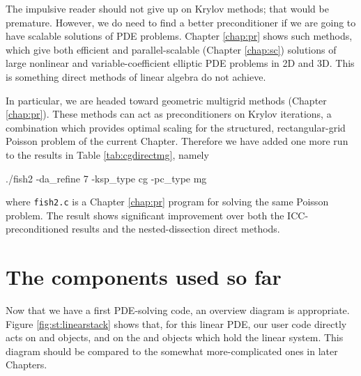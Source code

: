 The impulsive reader should not give up on Krylov methods; that would be premature.  However, we do need to find a better preconditioner if we are going to have scalable solutions of PDE problems.  Chapter \ref{chap:pr} shows such methods, which give both efficient and parallel-scalable (Chapter \ref{chap:sc}) solutions of large nonlinear and variable-coefficient elliptic PDE problems in 2D and 3D.  This is something direct methods of linear algebra do not achieve.

In particular, we are headed toward geometric multigrid methods (Chapter \ref{chap:pr}).  These methods can act as preconditioners on Krylov iterations, a combination which provides optimal scaling for the structured, rectangular-grid Poisson problem of the current Chapter.  Therefore we have added one more run to the results in Table \ref{tab:cgdirectmg}, namely
\begin{cline}
./fish2 -da_refine 7 -ksp_type cg -pc_type mg
\end{cline}
where \texttt{fish2.c} is a Chapter \ref{chap:pr} program for solving the same Poisson problem.  The result shows significant improvement over both the ICC-preconditioned results and the nested-dissection direct methods.


\section{The \PETSc components used so far}

Now that we have a first PDE-solving \PETSc code, an overview diagram is appropriate.  Figure \ref{fig:st:linearstack} shows that, for this linear PDE, our user code directly acts on \pKSP and \pDMDA objects, and on the \pVec and \pMat objects which hold the linear system.  This diagram should be compared to the somewhat more-complicated ones in later Chapters. 


